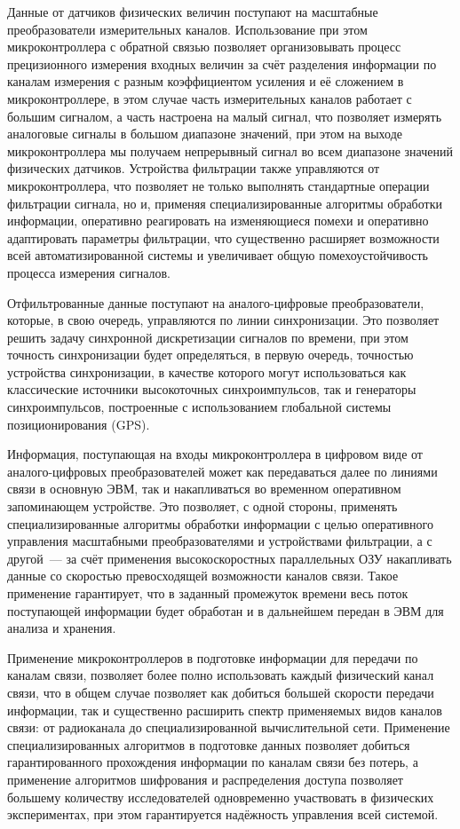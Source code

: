 \documentclass[a4paper, 14pt, titlepage]{extarticle}
\begin{document}
  Данные от датчиков физических величин поступают на масштабные преобразователи измерительных
  каналов. Использование при этом микроконтроллера с обратной связью позволяет организовывать
  процесс прецизионного измерения входных величин за счёт разделения информации по каналам
  измерения с разным коэффициентом усиления и её сложением в микроконтроллере, в этом случае часть
  измерительных каналов работает с большим сигналом, а часть настроена на малый сигнал, что
  позволяет измерять аналоговые сигналы в большом диапазоне значений, при этом на выходе
  микроконтроллера мы получаем непрерывный сигнал во всем диапазоне значений физических датчиков.
  Устройства фильтрации также управляются от микроконтроллера, что позволяет не только выполнять
  стандартные операции фильтрации сигнала, но и, применяя специализированные алгоритмы обработки
  информации, оперативно реагировать на изменяющиеся помехи и оперативно адаптировать параметры
  фильтрации, что существенно расширяет возможности всей автоматизированной системы и увеличивает
  общую помехоустойчивость процесса измерения сигналов.

  Отфильтрованные данные поступают на аналого-цифровые преобразователи, которые, в свою очередь,
  управляются по линии синхронизации. Это позволяет решить задачу синхронной дискретизации сигналов
  по времени, при этом точность синхронизации будет определяться, в первую очередь, точностью
  устройства синхронизации, в качестве которого могут использоваться как классические источники
  высокоточных синхроимпульсов, так и генераторы синхроимпульсов, построенные с использованием
  глобальной системы позиционирования (GPS).

  Информация, поступающая на входы микроконтроллера в цифровом виде от аналого-цифровых
  преобразователей может как передаваться далее по линиями связи в основную ЭВМ, так и
  накапливаться во временном оперативном запоминающем устройстве. Это позволяет, с одной стороны,
  применять специализированные алгоритмы обработки информации с целью оперативного управления
  масштабными преобразователями и устройствами фильтрации, а с другой~--- за счёт применения
  высокоскоростных параллельных ОЗУ накапливать данные со скоростью превосходящей возможности
  каналов связи. Такое применение гарантирует, что в заданный промежуток времени весь поток
  поступающей информации будет обработан и в дальнейшем передан в ЭВМ для анализа и хранения.

  Применение микроконтроллеров в подготовке информации для передачи по каналам связи, позволяет
  более полно использовать каждый физический канал связи, что в общем случае позволяет как добиться
  большей скорости передачи информации, так и существенно расширить спектр применяемых видов каналов
  связи: от радиоканала до специализированной вычислительной сети. Применение специализированных
  алгоритмов в подготовке данных позволяет добиться гарантированного прохождения информации по
  каналам связи без потерь, а применение алгоритмов шифрования и распределения доступа позволяет
  большему количеству исследователей одновременно участвовать в физических экспериментах, при этом
  гарантируется надёжность управления всей системой.
\end{document}
